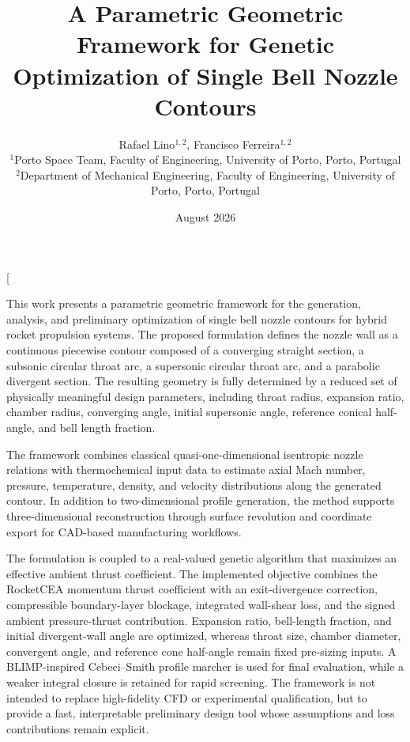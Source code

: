 \documentclass[11pt,a4paper]{article}
\title{A Parametric Geometric Framework for Genetic Optimization of Single Bell Nozzle Contours}
\author{
Rafael Lino$^{1,2}$, Francisco Ferreira$^{1,2}$\\[3pt]
\small $^1$Porto Space Team, Faculty of Engineering, University of Porto, Porto, Portugal\\
\small $^2$Department of Mechanical Engineering, Faculty of Engineering, University of Porto, Porto, Portugal
}
\date{August 2026}
\begin{document}

\twocolumn[
\maketitle

\begin{onecolabstract}
This work presents a parametric geometric framework for the generation, analysis, and preliminary optimization of single bell nozzle contours for hybrid rocket propulsion systems. The proposed formulation defines the nozzle wall as a continuous piecewise contour composed of a converging straight section, a subsonic circular throat arc, a supersonic circular throat arc, and a parabolic divergent section. The resulting geometry is fully determined by a reduced set of physically meaningful design parameters, including throat radius, expansion ratio, chamber radius, converging angle, initial supersonic angle, reference conical half-angle, and bell length fraction.

The framework combines classical quasi-one-dimensional isentropic nozzle relations with thermochemical input data to estimate axial Mach number, pressure, temperature, density, and velocity distributions along the generated contour. In addition to two-dimensional profile generation, the method supports three-dimensional reconstruction through surface revolution and coordinate export for CAD-based manufacturing workflows.

The formulation is coupled to a real-valued genetic algorithm that maximizes an effective ambient thrust coefficient. The implemented objective combines the RocketCEA momentum thrust coefficient with an exit-divergence correction, compressible boundary-layer blockage, integrated wall-shear loss, and the signed ambient pressure-thrust contribution. Expansion ratio, bell-length fraction, and initial divergent-wall angle are optimized, whereas throat size, chamber diameter, convergent angle, and reference cone half-angle remain fixed pre-sizing inputs. A BLIMP-inspired Cebeci--Smith profile marcher is used for final evaluation, while a weaker integral closure is retained for rapid screening. The framework is not intended to replace high-fidelity CFD or experimental qualification, but to provide a fast, interpretable preliminary design tool whose assumptions and loss contributions remain explicit.
\end{onecolabstract}
\end{document}
